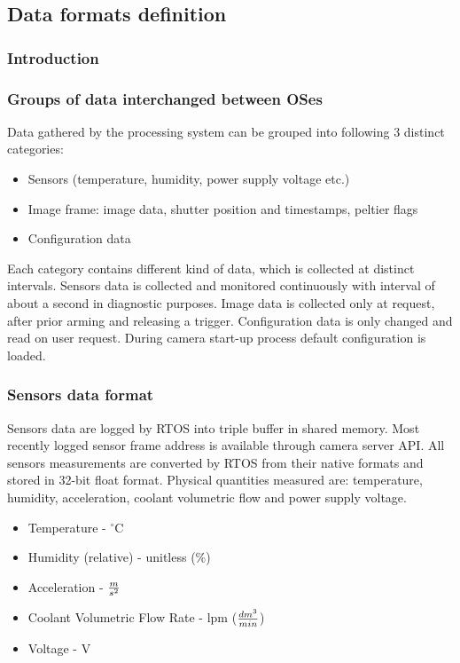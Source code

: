 \subsection{Data formats definition}

\subsubsection{Introduction}

\subsubsection{Groups of data interchanged between OSes}
Data gathered by the processing system can be grouped into following 3 distinct categories:

\begin{itemize}
\item Sensors (temperature, humidity, power supply voltage etc.)
\item Image frame: image data, shutter position and timestamps, peltier flags
\item Configuration data
\end{itemize}

Each category contains different kind of data, which is collected at distinct intervals. Sensors data is collected and monitored continuously with interval of about a second in diagnostic purposes. Image data is collected only at request, after prior arming and releasing a trigger. Configuration data is only changed and read on user request. During camera start-up process default configuration is loaded. 

\subsubsection{Sensors data format}
Sensors data are logged by RTOS into triple buffer in shared memory. Most recently logged sensor frame address is available through camera server API. All sensors measurements are converted by RTOS from their native formats and stored in 32-bit float format. Physical quantities measured are: temperature, humidity, acceleration, coolant volumetric flow and power supply voltage.

\begin{itemize}
\item Temperature - ${}^{\circ}\mathrm{C}$
\item Humidity (relative) - unitless (\%)
\item Acceleration - ${m} \over {s^2}$
\item Coolant Volumetric Flow Rate - lpm (${dm^{3}} \over {min}$)
\item Voltage - V
\end{itemize}

